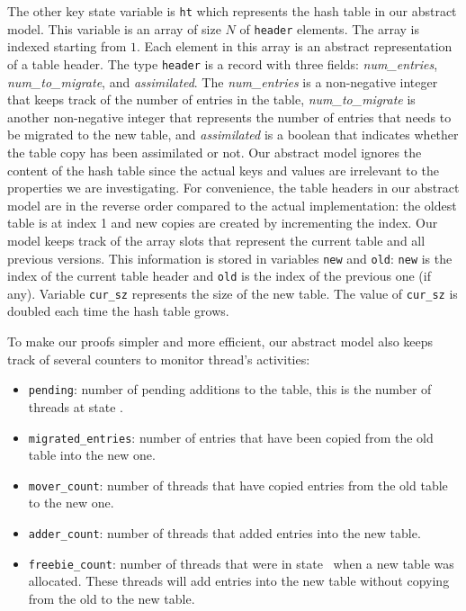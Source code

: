 The other key state variable is \texttt{ht} which represents the hash
table in our abstract model. This variable is an array of size $N$ of
\texttt{header} elements. The array is indexed starting from $1$.
Each element in this array is an abstract representation of a table header. 
The type \texttt{header} is a record with three fields:
\emph{num\_entries}, \emph{num\_to\_migrate}, and
\emph{assimilated}. The \emph{num\_entries} is a non-negative integer
that keeps track of the number of entries in the table,
\emph{num\_to\_migrate} is another non-negative integer that
represents the number of entries that needs to be migrated to the new
table, and \emph{assimilated} is a boolean that indicates whether the
table copy has been assimilated or not.  Our abstract model ignores
the content of the hash table since the actual keys and values are
irrelevant to the properties we are investigating. For convenience,
the table headers in our abstract model are in the reverse order
compared to the actual implementation: the oldest table is at index 1
and new copies are created by incrementing the index.  Our model keeps
track of the array slots that represent the current table and all
previous versions. This information is stored in variables
\texttt{new} and \texttt{old}: \texttt{new} is the index of the
current table header and \texttt{old} is the index of the previous one (if any).
Variable \texttt{cur\_sz}
represents the size of the new table. The value of \texttt{cur\_sz} is
doubled each time the hash table grows.

To make our proofs simpler and more efficient, our abstract model also
keeps track of several counters to monitor thread's activities:

\begin{itemize}

\item \texttt{pending}: number of pending additions to the table, this
  is the number of threads at state \pcone.

\item \texttt{migrated\_entries}: number of entries that have been
  copied from the old table into the new one.

\item \texttt{mover\_count}: number of threads that have copied
  entries from the old table to the new one.

\item \texttt{adder\_count}: number of threads that added entries into
  the new table.
  
\item \texttt{freebie\_count}: number of threads that were in state
  \pcone\ when a new table was allocated. These threads will add
  entries into the new table without copying from the old to the new
  table.

\end{itemize}  

